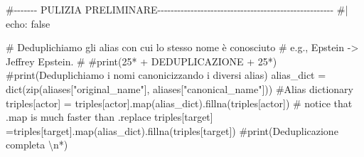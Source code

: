 \documentclass[
  italian,
  a4paper,
]{article}
\newenvironment{Shaded}{\begin{snugshade}}{\end{snugshade}}
\newcommand{\BuiltInTok}[1]{\textcolor[rgb]{0.00,0.23,0.31}{#1}}
\newcommand{\CommentTok}[1]{\textcolor[rgb]{0.37,0.37,0.37}{#1}}
\newcommand{\NormalTok}[1]{\textcolor[rgb]{0.00,0.23,0.31}{#1}}
\newcommand{\OperatorTok}[1]{\textcolor[rgb]{0.37,0.37,0.37}{#1}}
\newcommand{\StringTok}[1]{\textcolor[rgb]{0.13,0.47,0.30}{#1}}
\begin{document}
\begin{Shaded}
\begin{Highlighting}[]
\CommentTok{\#{-}{-}{-}{-}{-}{-}{-} PULIZIA PRELIMINARE{-}{-}{-}{-}{-}{-}{-}{-}{-}{-}{-}{-}{-}{-}{-}{-}{-}{-}{-}{-}{-}{-}{-}{-}{-}{-}{-}{-}{-}{-}{-}{-}{-}{-}{-}{-}{-}{-}{-}{-}{-}{-}{-}{-}{-}{-}{-}{-}{-}{-}{-}{-}{-}}
\CommentTok{\#| echo: false}

\CommentTok{\# Deduplichiamo gli alias con cui lo stesso nome è conosciuto}
\CommentTok{\# e.g., \textquotesingle{}Epstein\textquotesingle{} {-}\textgreater{} \textquotesingle{}Jeffrey Epstein\textquotesingle{}.}
\CommentTok{\# }
\CommentTok{\#print(25*\textquotesingle{}{-}\textquotesingle{} +\textquotesingle{} DEDUPLICAZIONE \textquotesingle{} + 25*\textquotesingle{}{-}\textquotesingle{})}
\CommentTok{\#print(\textquotesingle{}Deduplichiamo i nomi canonicizzando i diversi alias\textquotesingle{})}
\NormalTok{alias\_dict }\OperatorTok{=} \BuiltInTok{dict}\NormalTok{(}\BuiltInTok{zip}\NormalTok{(aliases[}\StringTok{"original\_name"}\NormalTok{], aliases[}\StringTok{"canonical\_name"}\NormalTok{])) }\CommentTok{\#Alias dictionary}
\NormalTok{triples[}\StringTok{\textquotesingle{}actor\textquotesingle{}}\NormalTok{] }\OperatorTok{=}\NormalTok{ triples[}\StringTok{\textquotesingle{}actor\textquotesingle{}}\NormalTok{].}\BuiltInTok{map}\NormalTok{(alias\_dict).fillna(triples[}\StringTok{\textquotesingle{}actor\textquotesingle{}}\NormalTok{]) }\CommentTok{\# notice that .map is much faster than .replace}
\NormalTok{triples[}\StringTok{\textquotesingle{}target\textquotesingle{}}\NormalTok{] }\OperatorTok{=}\NormalTok{triples[}\StringTok{\textquotesingle{}target\textquotesingle{}}\NormalTok{].}\BuiltInTok{map}\NormalTok{(alias\_dict).fillna(triples[}\StringTok{\textquotesingle{}target\textquotesingle{}}\NormalTok{])}
\CommentTok{\#print(\textquotesingle{}Deduplicazione completa \textbackslash{}n*\textquotesingle{})}




\end{Highlighting}
\end{Shaded}
\end{document}
